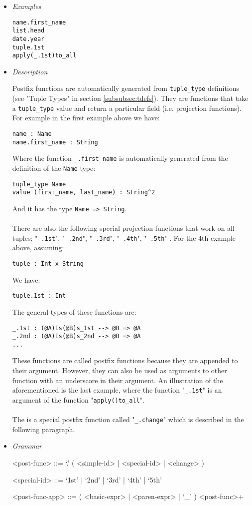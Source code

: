 \documentclass{article}
\begin{document}
\begin{itemize}

\item \textit{Examples}
\begin{verbatim}
name.first_name
list.head
date.year
tuple.1st
apply(_.1st)to_all
\end{verbatim}

\item \textit{Description} 

Postfix functions are automatically generated from \verb|tuple_type|
definitions (see "Tuple Types" in section \ref{subsubsec:tdefs}). They are
functions that take a \verb|tuple_type| value and return a particular field
(i.e. projection functions). For example in the first example above we have:
\begin{verbatim}
name : Name
name.first_name : String
\end{verbatim}
Where the function \verb|_.first_name| is automatically generated from the
definition of the \verb|Name| type:
\begin{verbatim}
tuple_type Name
value (first_name, last_name) : String^2
\end{verbatim}
And it has the type \verb|Name => String|.
\\\\
There are also the following special projection functions that work on all
tuples:
"\verb|_.1st|", "\verb|_.2nd|", "\verb|_.3rd|", "\verb|_.4th|", "\verb|_.5th|"
.
For the 4th example above, assuming:
\begin{verbatim}
tuple : Int x String
\end{verbatim}
We have:
\begin{verbatim}
tuple.1st : Int
\end{verbatim}
The general types of these functions are:
\begin{verbatim}
_.1st : (@A)Is(@B)s_1st --> @B => @A
_.2nd : (@A)Is(@B)s_2nd --> @B => @A
...
\end{verbatim}
These functions are called postfix functions because they are appended to their
argument. However, they can also be used as arguments to other function with an
underscore in their argument.  An illustration of the aforementioned is the
last example, where the function "\verb|_.1st|" is an argument of the function
"\verb|apply()to_all|".
\\\\
The is a special postfix function called "\verb|_.change|" which is described
in the following paragraph.

\item \textit{Grammar}
\begin{grammar}
<post-func> ::= `.' ( <simple-id> | <special-id> | <change> )

<special-id> ::= `1st' | `2nd' | `3rd' | `4th' | `5th'

<post-func-app> ::= ( <basic-expr> | <paren-expr> | `_' ) <post-func>+
\end{grammar}

\end{itemize}
\end{document}

